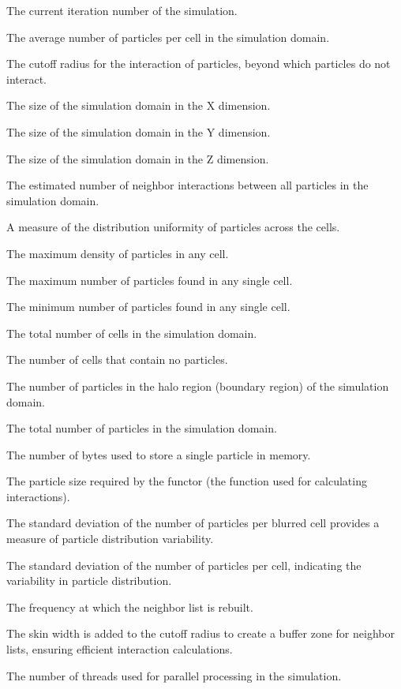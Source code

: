 \begin{description}[style=multiline, leftmargin =40mm]
  \item [Iteration] The current iteration number of the simulation.
  \item [avgParticlesPerCell] The average number of particles per cell in the simulation domain.
  \item [cutoff] The cutoff radius for the interaction of particles, beyond which particles do not interact.
  \item [domainSizeX] The size of the simulation domain in the X dimension.
  \item [domainSizeY] The size of the simulation domain in the Y dimension.
  \item [domainSizeZ] The size of the simulation domain in the Z dimension.
  \item [estimatedNumNeighborInteractions] The estimated number of neighbor interactions between all particles in the simulation domain.
  \item [homogeneity] A measure of the distribution uniformity of particles across the cells.
  \item [maxDensity] The maximum density of particles in any cell.
  \item [maxParticlesPerCell] The maximum number of particles found in any single cell.
  \item [minParticlesPerCell] The minimum number of particles found in any single cell.
  \item [numCells] The total number of cells in the simulation domain.
  \item [numEmptyCells] The number of cells that contain no particles.
  \item [numHaloParticles] The number of particles in the halo region (boundary region) of the simulation domain.
  \item [numParticles] The total number of particles in the simulation domain.
  \item [particleSize] The number of bytes used to store a single particle in memory.
  \item [particleSizeNeededByFunctor] The particle size required by the functor (the function used for calculating interactions).
  \item [particlesPerBlurredCellStdDev] The standard deviation of the number of particles per blurred cell provides a measure of particle distribution variability.
  \item [particlesPerCellStdDev] The standard deviation of the number of particles per cell, indicating the variability in particle distribution.
  \item [rebuildFrequency] The frequency at which the neighbor list is rebuilt.
  \item [skin] The skin width is added to the cutoff radius to create a buffer zone for neighbor lists, ensuring efficient interaction calculations.
  \item [threadCount] The number of threads used for parallel processing in the simulation.
\end{description}


